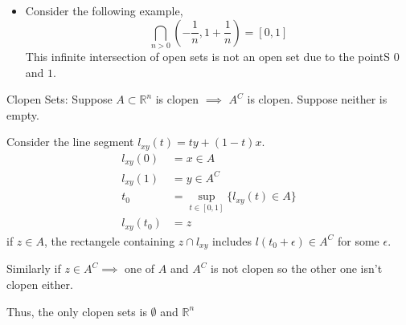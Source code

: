 \documentclass[a4paper]{article}
\numberwithin{equation}{section}
\newcommand{\R}{\mathbb{R}}
\begin{document}
\begin{itemize}
    \item Consider the following example,
    \begin{equation}
        \bigcap_{n>0}\left(-\frac{1}{n},1+\frac{1}{n}\right)=[0,1]
    \end{equation}
    This infinite intersection of open sets is not an open set due to the pointS $0$ and $1$.
\end{itemize}
{
    Clopen Sets:
Suppose $A\subset\R^n$ is clopen $\implies$ $A^C$ is clopen. Suppose neither is empty. 

Consider the line segment $l_{xy}(t)=ty+(1-t)x$.
\begin{align}
    l_{xy}(0)&=x\in A\\
    l_{xy}(1)&=y\in A^C\\
    t_0&=\sup_{t\in[0,1]}\{l_{xy}(t)\in A\}\\
    l_{xy}(t_0)&=z
\end{align}
if $z\in A$, the rectangele containing $z\cap l_{xy}$ includes $l(t_0+\epsilon)\in A^C$ for some $\epsilon$.

Similarly if $z\in A^C\implies$ one of $A$ and $A^C$ is not clopen so the other one isn't clopen either. 

Thus, the only clopen sets is $\emptyset$ and $\R^n$

}
\end{document}
